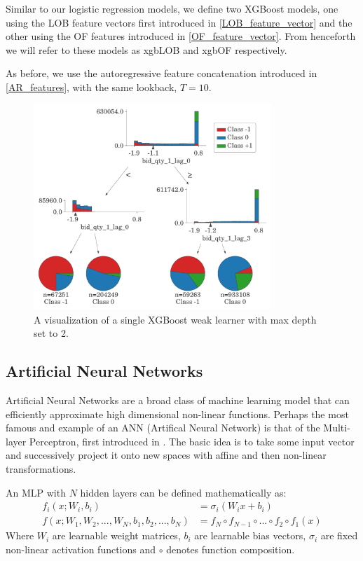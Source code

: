 \documentclass[a4paper, oneside, notitlepage]{book}
\begin{document}
Similar to our logistic regression models, we define two XGBoost models, one using the LOB feature vectors first introduced in \ref{LOB_feature_vector}
and the other using the OF features introduced in \ref{OF_feature_vector}. 
From henceforth we will refer to these models as xgbLOB and xgbOF respectively.

As before, we use the autoregressive feature concatenation introduced in \ref{AR_features}, with the same lookback, $T = 10$.

\begin{figure}[htpb]
    \centering
    \includegraphics[width=0.8\textwidth]{./images/xgb_viz.pdf}
    \caption{A visualization of a single XGBoost weak learner with max depth set to 2.}
    \label{fig:weaklearner}
\end{figure}


\subsection{Artificial Neural Networks}
Artificial Neural Networks are a broad class of machine learning model that can efficiently approximate
high dimensional non-linear functions. Perhaps the most famous and example of an ANN (Artifical Neural Network)
is that of the Multi-layer Perceptron, first introduced in \cite{ROSENBLATT1958}. The basic idea is to take some input
vector and successively project it onto new spaces with affine and then non-linear transformations.

An MLP with $N$ hidden layers can be defined mathematically as:
\begin{equation}
    \begin{aligned}
        f_i(x; W_i, b_i) &= \sigma_i(W_i x + b_i) \\
        f(x; W_1, W_2, ..., W_N, b_1, b_2, ..., b_N) &= f_N \circ f_{N-1} \circ ... \circ f_2 \circ f_1(x)
    \end{aligned}
\end{equation}
Where $W_i$  are learnable weight matrices, $b_i$ are learnable bias vectors, $\sigma_i$ are fixed non-linear activation functions and $\circ$ denotes function composition.
\end{document}
